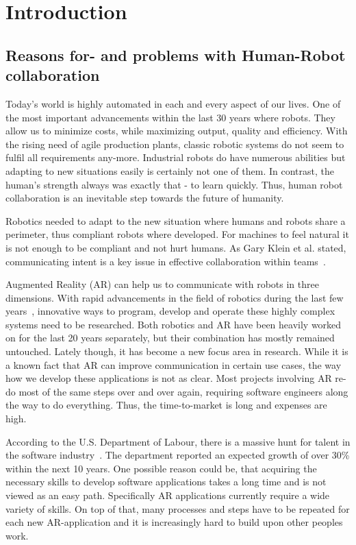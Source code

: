\chapter{Introduction}\label{Chap:Introduction}

\section{Reasons for- and problems with Human-Robot collaboration}
Today's world is highly automated in each and every aspect of our lives. One of the most important advancements within the last 30 years where robots. They allow us to minimize costs, while maximizing output, quality and efficiency. With the rising need of agile production plants, classic robotic systems do not seem to fulfil all requirements any-more. Industrial robots do have numerous abilities but adapting to new situations easily is certainly not one of them. In contrast, the human's strength always was exactly that - to learn quickly. Thus, human robot collaboration is an inevitable step towards the future of humanity.

Robotics needed to adapt to the new situation where humans and robots share a perimeter, thus compliant robots where developed. For machines to feel natural it is not enough to be compliant and not hurt humans. As Gary Klein et al. stated, communicating intent is a key issue in effective collaboration within teams~\cite{klein2005common}. 

Augmented Reality (AR) can help us to communicate with robots in three dimensions. With rapid advancements in the field of robotics during the last few years~\cite{laschi2016soft}, innovative ways to program, develop and operate these highly complex systems need to be researched. Both robotics and AR have been heavily worked on for the last 20 years separately, but their combination has mostly remained untouched. Lately though, it has become a new focus area in research. While it is a known fact that AR can improve communication in certain use cases, the way how we develop these applications is not as clear. Most projects involving AR re-do most of the same steps over and over again, requiring software engineers along the way to do everything. Thus, the time-to-market is long and expenses are high.

According to the U.S. Department of Labour, there is a massive hunt for talent in the software industry~\cite{blsGov}. The department reported an expected growth of over 30\% within the next 10 years. One possible reason could be, that acquiring the necessary skills to develop software applications takes a long time and is not viewed as an easy path. Specifically AR applications currently require a wide variety of skills. On top of that, many processes and steps have to be repeated for each new AR-application and it is increasingly hard to build upon other peoples work.

